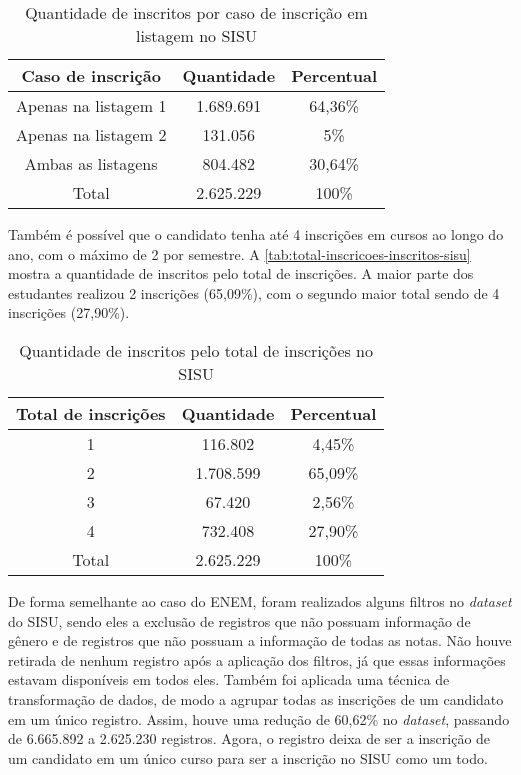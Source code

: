 \begin{table}[h]
  \begin{tabular}{ccc}
  \hline
  \textbf{Caso de inscrição} & \textbf{Quantidade} & \textbf{Percentual} \\ \hline
  Apenas na listagem 1  & 1.689.691  &  64,36\%                      \\ \hline
  Apenas na listagem 2  & 131.056  &   5\%                        \\ \hline
  Ambas as listagens & 804.482  &    30,64\%                     \\ \hline
  Total  & 2.625.229  &  100\%                        \\ \hline
  \end{tabular}
  \caption{Quantidade de inscritos por caso de inscrição em listagem no SISU}
  \label{tab:caso-inscricao-sisu}
  \end{table}

Também é possível que o candidato tenha até 4 inscrições em cursos ao longo do ano, com o máximo de 2 por semestre. A \autoref{tab:total-inscricoes-inscritos-sisu} mostra a quantidade de inscritos pelo total de inscrições. A maior parte dos estudantes realizou 2 inscrições (65,09\%), com o segundo maior total sendo de 4 inscrições (27,90\%). 

\begin{table}[]
  \centering
  \begin{tabular}{ccc}
  \hline
  \textbf{Total de inscrições} & \textbf{Quantidade} & \textbf{Percentual} \\ \hline
  1                   & 116.802  &  4,45\%  \\ \hline
  2                   & 1.708.599  &  65,09\%  \\ \hline
  3                   & 67.420  &  2,56\%  \\ \hline
  4                   & 732.408  & 27,90\%  \\ \hline
  Total               & 2.625.229  &  100\%  \\ \hline
  \end{tabular}
  \caption{Quantidade de inscritos pelo total de inscrições no SISU}
  \label{tab:total-inscricoes-inscritos-sisu}
  \end{table}

De forma semelhante ao caso do ENEM, foram realizados alguns filtros no \textit{dataset} do SISU, sendo eles a exclusão de registros que não possuam informação de gênero e de registros que não possuam a informação de todas as notas. Não houve retirada de nenhum registro após a aplicação dos filtros, já que essas informações estavam disponíveis em todos eles. Também foi aplicada uma técnica de transformação de dados, de modo a agrupar todas as inscrições de um candidato em um único registro. Assim, houve uma redução de 60,62\% no \textit{dataset}, passando de 6.665.892 a 2.625.230 registros. Agora, o registro deixa de ser a inscrição de um candidato em um único curso para ser a inscrição no SISU como um todo.

